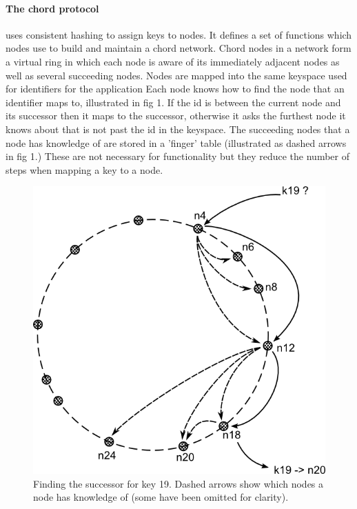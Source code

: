 \documentclass{article}
\begin{document}
\paragraph{The chord protocol} \cite{chord} uses consistent hashing to assign keys to nodes. It defines a set of functions which nodes use to build and maintain a chord network. Chord nodes in a network form a virtual ring in which each node is aware of its immediately adjacent nodes as well as several succeeding nodes.
Nodes are mapped into the same keyspace used for identifiers for the application
Each node knows how to find the node that an identifier maps to, illustrated in fig 1. If the id is between the current node and its successor then it maps to the successor, otherwise it asks the furthest node it knows about that is not past the id in the keyspace. The succeeding nodes that a node has knowledge of are stored in a 'finger' table (illustrated as dashed arrows in fig 1.) These are not necessary for functionality but they reduce the number of steps when mapping a key to a node.
\begin{figure}
\centering
\includegraphics{chord_find-successor.png}
\caption{Finding the successor for key 19. Dashed arrows show which nodes a node has knowledge of (some have been omitted for clarity).}
\end{figure}
\end{document}
